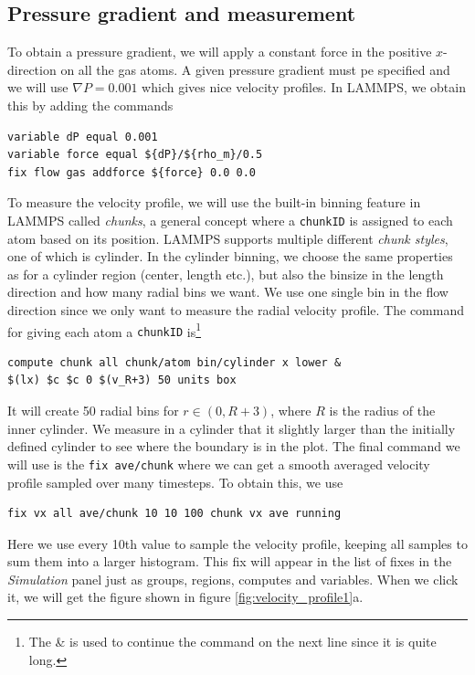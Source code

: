\documentclass[12pt,a4paper,final]{iopart}
\newcommand{\code}[1]{\colorbox{light-gray}{\color{RawSienna}\texttt{#1}}}
\begin{document}
\subsection{Pressure gradient and measurement}
To obtain a pressure gradient, we will apply a constant force in the positive $x$-direction on all the gas atoms.
A given pressure gradient must pe specified and we will use $\nabla P = 0.001$ which gives nice velocity profiles.
In LAMMPS, we obtain this by adding the commands
\begin{lstlisting}
variable dP equal 0.001
variable force equal ${dP}/${rho_m}/0.5
fix flow gas addforce ${force} 0.0 0.0
\end{lstlisting}
To measure the velocity profile, we will use the built-in binning feature in LAMMPS called \textit{chunks},
a general concept where a \code{chunkID} is assigned to each atom
based on its position. LAMMPS supports multiple different \textit{chunk styles}, one of which is cylinder.
In the cylinder binning, we choose the same properties as for a cylinder region (center, length etc.), but also the binsize in the length direction and how many radial bins we want.
We use one single bin in the flow direction since we only want to measure the radial velocity profile.
The command for giving each atom a \code{chunkID} is\footnote{The \& is used to continue the command on the next line since it is quite long.}
\begin{lstlisting}
compute chunk all chunk/atom bin/cylinder x lower &
$(lx) $c $c 0 $(v_R+3) 50 units box
\end{lstlisting}
It will create 50 radial bins for $r\in (0, R+3)$, where $R$ is the radius of the inner cylinder.
We measure in a cylinder that it slightly larger than the initially defined cylinder to see where the boundary is in the plot.
The final command we will use is the \code{fix ave/chunk} where we can get a smooth averaged velocity profile sampled over many timesteps.
To obtain this, we use
\begin{lstlisting}
fix vx all ave/chunk 10 10 100 chunk vx ave running
\end{lstlisting}
Here we use every 10th value to sample the velocity profile, keeping all samples to sum them into a larger histogram.
This fix will appear in the list of fixes in the \textit{Simulation} panel just as groups, regions, computes and variables.
When we click it, we will get the figure shown in figure \ref{fig:velocity_profile1}a.
\end{document}
